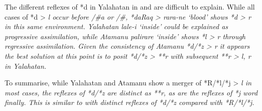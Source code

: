 The different reflexes of *d in Yalahatan in 
and  are difficult to explain.
While all cases of *d > \it{l} occur before /{\#}{\gap}a or /{\gap}{\#},
*daRaq > \it{rara-ne} ‘blood’ shows *d > \it{r} in this same environment.
Yalahatan \it{lale-i} ‘inside’ could be explained as progressive
assimilation, while Atamanu \it{palirare} ‘inside’ shows *l > \it{r} through regressive assimilation.
Given the consistency of Atamanu *d/*z > \it{r} it appears the
best solution at this point is to posit *d/*z > **r with subsequent
**r > \it{l, r} in Yalahatan.

To summarise, while Yalahatan
and Atamanu show a merger of *R/*l/*j > \it{l} in most cases,
the reflexes of *d/*z are distinct as **r,
as are the reflexes of *j word finally.
This is similar to  with distinct reflexes
of *d/*z compared with *R/*l/*j.